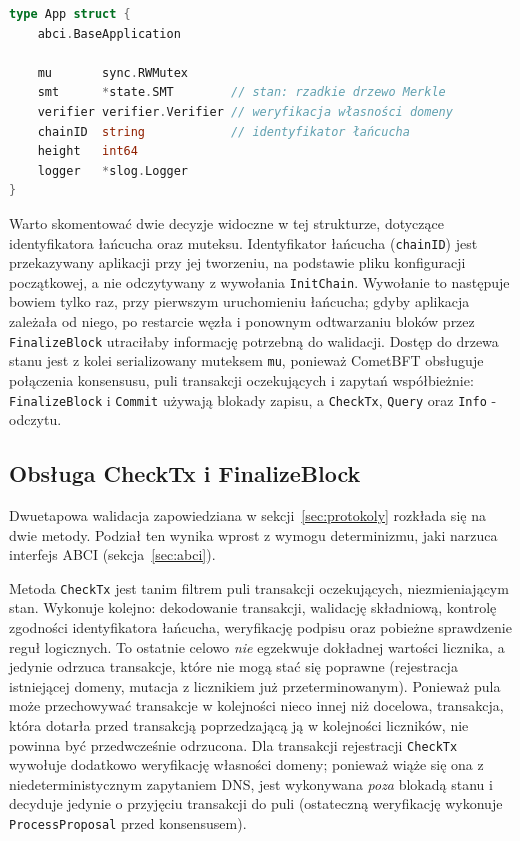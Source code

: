 \begin{lstlisting}[language=Go,caption={Struktura aplikacji ABCI},label={lst:app-struct}]
type App struct {
    abci.BaseApplication

    mu       sync.RWMutex
    smt      *state.SMT        // stan: rzadkie drzewo Merkle
    verifier verifier.Verifier // weryfikacja własności domeny
    chainID  string            // identyfikator łańcucha
    height   int64
    logger   *slog.Logger
}
\end{lstlisting}

Warto skomentować dwie decyzje widoczne w tej strukturze, dotyczące identyfikatora łańcucha oraz muteksu. Identyfikator łańcucha (\texttt{chainID}) jest przekazywany aplikacji przy jej tworzeniu, na podstawie pliku konfiguracji początkowej, a nie odczytywany z wywołania \texttt{InitChain}. Wywołanie to następuje bowiem tylko raz, przy pierwszym uruchomieniu łańcucha; gdyby aplikacja zależała od niego, po restarcie węzła i ponownym odtwarzaniu bloków przez \texttt{FinalizeBlock} utraciłaby informację potrzebną do walidacji. Dostęp do drzewa stanu jest z kolei serializowany muteksem \texttt{mu}, ponieważ CometBFT obsługuje połączenia konsensusu, puli transakcji oczekujących i zapytań współbieżnie: \texttt{FinalizeBlock} i \texttt{Commit} używają blokady zapisu, a \texttt{CheckTx}, \texttt{Query} oraz \texttt{Info} - odczytu.

\subsection{Obsługa CheckTx i FinalizeBlock}
\label{subsec:checktx-finalize}

Dwuetapowa walidacja zapowiedziana w sekcji~\ref{sec:protokoly} rozkłada się na dwie metody. Podział ten wynika wprost z wymogu determinizmu, jaki narzuca interfejs ABCI (sekcja~\ref{sec:abci}).

Metoda \texttt{CheckTx} jest tanim filtrem puli transakcji oczekujących, niezmieniającym stan. Wykonuje kolejno: dekodowanie transakcji, walidację składniową, kontrolę zgodności identyfikatora łańcucha, weryfikację podpisu oraz pobieżne sprawdzenie reguł logicznych. To ostatnie celowo \emph{nie} egzekwuje dokładnej wartości licznika, a jedynie odrzuca transakcje, które nie mogą stać się poprawne (rejestracja istniejącej domeny, mutacja z licznikiem już przeterminowanym). Ponieważ pula może przechowywać transakcje w kolejności nieco innej niż docelowa, transakcja, która dotarła przed transakcją poprzedzającą ją w kolejności liczników, nie powinna być przedwcześnie odrzucona. Dla transakcji rejestracji \texttt{CheckTx} wywołuje dodatkowo weryfikację własności domeny; ponieważ wiąże się ona z niedeterministycznym zapytaniem DNS, jest wykonywana \emph{poza} blokadą stanu i decyduje jedynie o przyjęciu transakcji do puli (ostateczną weryfikację wykonuje \texttt{ProcessProposal} przed konsensusem).


